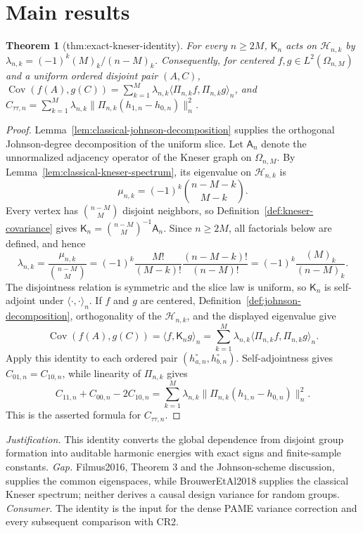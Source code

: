 \documentclass{article}
\newtheorem{theorem}{Theorem}
\begin{document}
\section{Main results}

\begin{theorem}[thm:exact-kneser-identity]\label{thm:exact-kneser-identity}
For every \(n\ge2M\), \(\mathsf K_n\) acts on \(\mathcal H_{n,k}\) by \(\lambda_{n,k}=(-1)^k(M)_k/(n-M)_k\). Consequently, for centered \(f,g\in L^2(\Omega_{n,M})\) and a uniform ordered disjoint pair \((A,C)\), \(\operatorname{Cov}(f(A),g(C))=\sum_{k=1}^M\lambda_{n,k}\langle\Pi_{n,k}f,\Pi_{n,k}g\rangle_n\), and \(C_{\tau\tau,n}=\sum_{k=1}^M\lambda_{n,k}\|\Pi_{n,k}(h_{1,n}-h_{0,n})\|_n^2\).
\end{theorem}
\begin{proof}
Lemma~\ref{lem:classical-johnson-decomposition} supplies the orthogonal Johnson-degree decomposition of the uniform slice.  Let \(\mathsf A_n\) denote the unnormalized adjacency operator of the Kneser graph on \(\Omega_{n,M}\).  By Lemma~\ref{lem:classical-kneser-spectrum}, its eigenvalue on \(\mathcal H_{n,k}\) is
\[
 \mu_{n,k}=(-1)^k\binom{n-M-k}{M-k}.
\]
Every vertex has \(\binom{n-M}{M}\) disjoint neighbors, so Definition~\ref{def:kneser-covariance} gives \(\mathsf K_n=\binom{n-M}{M}^{-1}\mathsf A_n\).  Since \(n\ge 2M\), all factorials below are defined, and hence
\[
 \lambda_{n,k}
 =\frac{\mu_{n,k}}{\binom{n-M}{M}}
 =(-1)^k\frac{M!}{(M-k)!}\frac{(n-M-k)!}{(n-M)!}
 =(-1)^k\frac{(M)_k}{(n-M)_k}.
\]
The disjointness relation is symmetric and the slice law is uniform, so \(\mathsf K_n\) is self-adjoint under \(\langle\cdot,\cdot\rangle_n\).  If \(f\) and \(g\) are centered, Definition~\ref{def:johnson-decomposition}, orthogonality of the \(\mathcal H_{n,k}\), and the displayed eigenvalue give
\[
 \operatorname{Cov}(f(A),g(C))
 =\langle f,\mathsf K_ng\rangle_n
 =\sum_{k=1}^M\lambda_{n,k}
   \langle\Pi_{n,k}f,\Pi_{n,k}g\rangle_n.
\]
Apply this identity to each ordered pair \((h_{a,n}^{\circ},h_{b,n}^{\circ})\).  Self-adjointness gives \(C_{01,n}=C_{10,n}\), while linearity of \(\Pi_{n,k}\) gives
\[
 C_{11,n}+C_{00,n}-2C_{10,n}
 =\sum_{k=1}^M\lambda_{n,k}
   \|\Pi_{n,k}(h_{1,n}-h_{0,n})\|_n^2.
\]
This is the asserted formula for \(C_{\tau\tau,n}\).
\end{proof}
\par\smallskip\noindent \textit{Justification.} This identity converts the global dependence from disjoint group formation into auditable harmonic energies with exact signs and finite-sample constants. \textit{Gap.} Filmus2016, Theorem 3 and the Johnson-scheme discussion, supplies the common eigenspaces, while BrouwerEtAl2018 supplies the classical Kneser spectrum; neither derives a causal design variance for random groups. \textit{Consumer.} The identity is the input for the dense PAME variance correction and every subsequent comparison with CR2.
\end{document}
